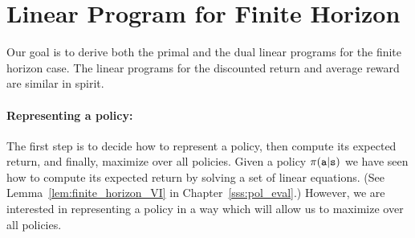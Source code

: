 
\section{Linear Program for Finite Horizon}
\label{C-MDP-FH:sec:LP}

Our goal is to derive both the primal and the dual linear programs for the finite horizon case. The linear programs for the discounted return and average reward are similar in spirit.

\paragraph{Representing a policy:}
The first step is to decide how to represent a policy, then compute its expected return, and finally, maximize over all policies.
Given a policy $\pi({\tt a}|{\tt s})$ we have seen how to compute its expected return by solving a set of linear equations. (See Lemma~\ref{lem:finite_horizon_VI} in Chapter~\ref{sss:pol_eval}.)
However, we are interested in representing a policy in a way which will allow us to maximize over all policies.

